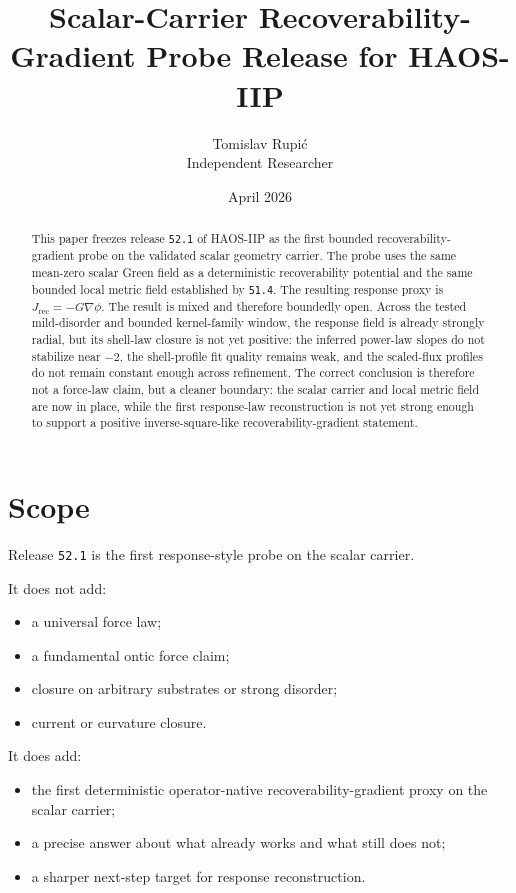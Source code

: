 \documentclass[11pt]{article}
\title{Scalar-Carrier Recoverability-Gradient Probe Release for HAOS-IIP}
\author{Tomislav Rupi\'c \\ Independent Researcher}
\date{April 2026}
\begin{document}
\maketitle

\begin{abstract}
This paper freezes release \texttt{52.1} of HAOS-IIP as the first bounded recoverability-gradient probe on the validated scalar geometry carrier. The probe uses the same mean-zero scalar Green field as a deterministic recoverability potential and the same bounded local metric field established by \texttt{51.4}. The resulting response proxy is \(J_{\mathrm{rec}} = - G \nabla \phi\). The result is mixed and therefore boundedly open. Across the tested mild-disorder and bounded kernel-family window, the response field is already strongly radial, but its shell-law closure is not yet positive: the inferred power-law slopes do not stabilize near \(-2\), the shell-profile fit quality remains weak, and the scaled-flux profiles do not remain constant enough across refinement. The correct conclusion is therefore not a force-law claim, but a cleaner boundary: the scalar carrier and local metric field are now in place, while the first response-law reconstruction is not yet strong enough to support a positive inverse-square-like recoverability-gradient statement.
\end{abstract}

\tableofcontents

\section{Scope}

Release \texttt{52.1} is the first response-style probe on the scalar carrier.

It does not add:
\begin{itemize}
\item a universal force law;
\item a fundamental ontic force claim;
\item closure on arbitrary substrates or strong disorder;
\item current or curvature closure.
\end{itemize}

It does add:
\begin{itemize}
\item the first deterministic operator-native recoverability-gradient proxy on the scalar carrier;
\item a precise answer about what already works and what still does not;
\item a sharper next-step target for response reconstruction.
\end{itemize}
\end{document}
